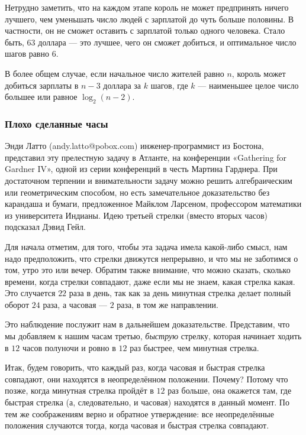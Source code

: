 Нетрудно заметить, что на каждом этапе король не может предпринять ничего лучшего, чем уменьшать число людей с зарплатой до чуть больше половины.
В частности, он не сможет оставить с зарплатой только одного человека.
Стало быть, $63$ доллара --- это лучшее, чего он сможет добиться, и оптимальное число шагов равно $6$.
\heart

В более общем случае, если начальное число жителей равно $n$, король может добиться зарплаты в $n-3$ доллара за $k$ шагов, где $k$ --- наименьшее целое число большее или равное $\log_2(n-2)$.

\subsubsection*{Плохо сделанные часы}%

Энди Латто %
(andy.latto@pobox.com) инженер-программист из Бостона, представил эту прелестную задачу в Атланте, на конференции «Gathering for Gard\-ner IV», одной из серии конференций в честь Мартина Гарднера.
При достаточном терпении и внимательности задачу можно решить алгебраическим или геометрическим способом, но есть замечательное доказательство без карандаша и бумаги, предложенное Майклом Ларсеном, %
профессором математики из университета Индианы.
Идею третьей стрелки (вместо вторых часов) подсказал Дэвид Гейл. %

\medskip

Для начала отметим, для того, чтобы эта задача имела какой-либо смысл, нам надо предположить, что стрелки движутся непрерывно, и что мы не заботимся о том, утро это или вечер.
Обратим также внимание, что можно сказать, сколько времени, когда стрелки совпадают, даже если мы не знаем, какая стрелка какая.
Это случается $22$ раза в день, так как за день минутная стрелка делает полный оборот $24$ раза, а часовая --- $2$ раза, в том же направлении.

Это наблюдение послужит нам в дальнейшем доказательстве.
Представим, что мы добавляем к нашим часам третью, \emph{быструю} стрелку, которая начинает ходить в $12$ часов полуночи и ровно в $12$ раз быстрее, чем минутная стрелка.

Итак, будем говорить, что каждый раз, когда часовая и быстрая стрелка совпадают, они находятся в неопределённом положении.
Почему?
Потому что позже, когда минутная стрелка пройдёт в $12$ раз больше, она окажется там, где быстрая стрелка (а, следовательно, и часовая) находятся в данный момент.
По тем же соображениям верно и обратное утверждение: все неопределённые положения случаются тогда, когда часовая и быстрая стрелка совпадают.

